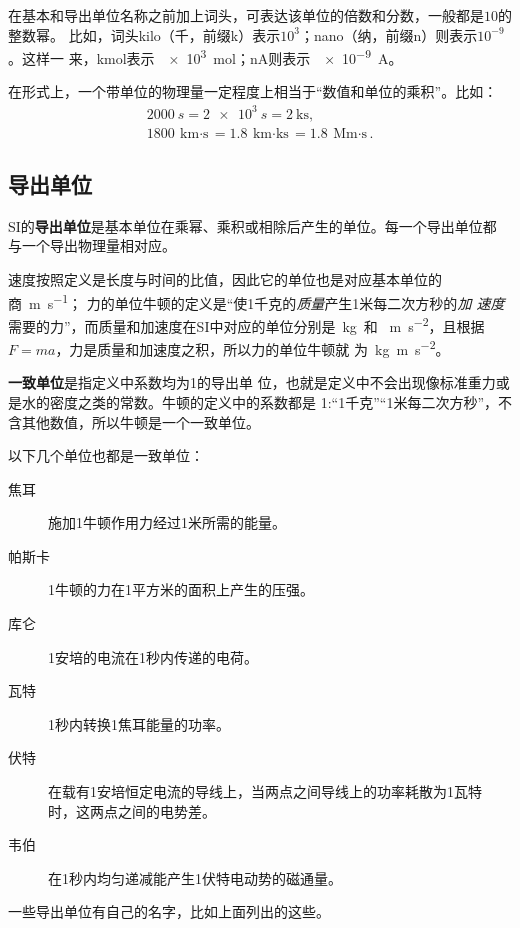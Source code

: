 在基本和导出单位名称之前加上词头，可表达该单位的倍数和分数，一般都是$10$的整数幂。
比如，词头kilo（千，前缀k）表示$10^3$；nano（纳，前缀n）则表示$10^{-9}$。这样一
来，\unit{\kilo\mol}表示~\qty{e3}{\mol}；\unit{\nano\A}则表示~\qty{e-9}{\A}。

在形式上，一个带单位的物理量一定程度上相当于“数值和单位的乘积”。比如：
\begin{gather*}
    \qty{2000}{s} = \qty{2e3}{s} = \qty{2}{\kilo\s},\\
    \qty{1800}{\km\cdot\s} = \qty{1.8}{\km\cdot\kilo\s} = \qty{1.8}
    {\mega\metre\cdot\s}
.\end{gather*} 

\subsection{导出单位}

SI的\textbf{导出单位}是基本单位在乘幂、乘积或相除后产生的单位。每一个导出单位都
与一个导出物理量相对应。

速度按照定义是长度与时间的比值，因此它的单位也是对应基本单位的商~\unit{\m\per\s}；
力的单位牛顿的定义是“使1千克的\emph{质量}产生1米每二次方秒的\emph{加
速度}需要的力”，而质量和加速度在SI中对应的单位分别是~\unit{\kg}~和%
~\unit{\m\per\square\s}，且根据$F=ma$，力是质量和加速度之积，所以力的单位牛顿就
为~\unit{\kg\m\per\square\s}。

\textbf{一致单位}是指定义中系数均为1的导出单
位，也就是定义中不会出现像标准重力或是水的密度之类的常数。牛顿的定义中的系数都是%
1:“1千克”“1米每二次方秒”，不含其他数值，所以牛顿是一个一致单位。

以下几个单位也都是一致单位：
\begin{description}
    \item[焦耳] 施加1牛顿作用力经过1米所需的能量。
    \item[帕斯卡] 1牛顿的力在1平方米的面积上产生的压强。
    \item[库仑] 1安培的电流在1秒内传递的电荷。
    \item[瓦特] 1秒内转换1焦耳能量的功率。
    \item[伏特] 在载有1安培恒定电流的导线上，当两点之间导线上的功率耗散为1瓦特
        时，这两点之间的电势差。
    \item[韦伯] 在1秒内均匀递减能产生1伏特电动势的磁通量。
\end{description}

一些导出单位有自己的名字，比如上面列出的这些。

